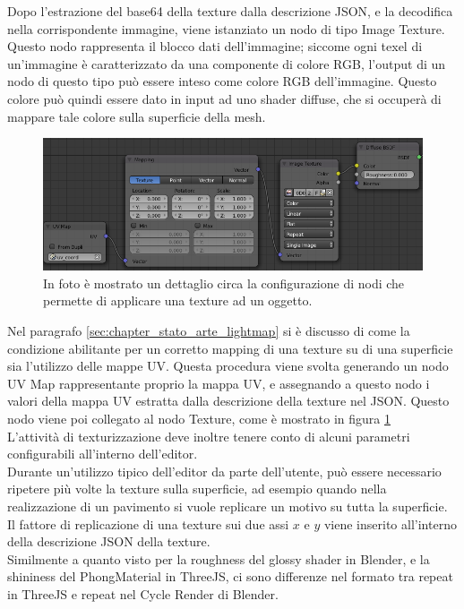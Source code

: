 Dopo l’estrazione del base64 della texture dalla descrizione JSON, e la decodifica nella corrispondente immagine, viene istanziato un nodo di tipo Image Texture. Questo nodo rappresenta il blocco dati dell’immagine; siccome ogni texel di un’immagine è caratterizzato da una componente di colore RGB, l’output di un nodo di questo tipo può essere inteso come colore RGB dell’immagine. Questo colore può quindi essere dato in input ad uno shader diffuse, che si occuperà di mappare tale colore sulla superficie della mesh. 
\\
\begin{figure}[htb]
 \centering
 \includegraphics[width=1\linewidth]{images/chapter_baking_service/ba_se_diffuse_uv_ma.png}\hfill
 \caption[Mappatura texturizzazione]{In foto è mostrato un dettaglio circa la configurazione di nodi che permette di applicare una texture ad un oggetto.}
 \label{fig:ba_se_diffuse_uv_ma}
\end{figure}
Nel paragrafo \ref{sec:chapter_stato_arte_lightmap} si è discusso di come la condizione abilitante per un corretto mapping di una texture su di una superficie sia l’utilizzo delle mappe UV. Questa procedura viene svolta generando un nodo UV Map rappresentante proprio la mappa UV, e assegnando a questo nodo i valori della mappa UV estratta dalla descrizione della texture nel JSON. Questo nodo viene poi collegato al nodo Texture, come è mostrato in figura \ref{fig:ba_se_diffuse_uv_ma}
\\
L’attività di texturizzazione deve inoltre tenere conto di alcuni parametri configurabili all’interno dell’editor. 
\\
Durante un’utilizzo tipico dell’editor da parte dell’utente, può essere necessario ripetere più volte la texture sulla superficie, ad esempio quando nella realizzazione di un pavimento si vuole replicare un motivo su tutta la superficie. Il fattore di replicazione di una texture sui due assi $x$ e $y$ viene inserito all’interno della descrizione JSON della texture.
\\
Similmente a quanto visto per la roughness del glossy shader in Blender, e la shininess del PhongMaterial in ThreeJS, ci sono differenze nel formato tra repeat in ThreeJS e repeat nel Cycle Render di Blender.
